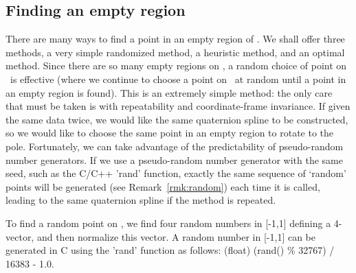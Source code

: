 
\subsection{Finding an empty region}

There are many ways to find a point in an empty region of .
We shall offer three methods, a very simple randomized method, 
a heuristic method, and an optimal method.
Since there are so many empty regions on ,
a random choice of point on \ is effective 
(where we continue to choose a point on \ 
at random until a point in an empty region is found).
This is an extremely simple method: the only care that must
be taken is with repeatability and coordinate-frame invariance.
If given the same data twice, we would like the same 
quaternion spline to be constructed, 
so we would like to choose the same point in an empty region
to rotate to the pole.
Fortunately, we can take advantage of the predictability 
of pseudo-random number generators.
If we use a pseudo-random number generator with the same seed,
such as the C/C++ 'rand' function, exactly the same sequence of `random'
points will be generated (see Remark~\ref{rmk:random}) 
each time it is called,
leading to the same quaternion spline if the method is repeated.
%
\begin{rmk}
\label{rmk:random}
To find a random point on , we find four random numbers 
in [-1,1] defining a 4-vector, and then normalize this vector.
A random number in [-1,1] can be generated in C using the 'rand' function
as follows:
(float) (rand() \% 32767) / 16383 - 1.0.
\end{rmk}
